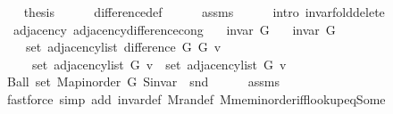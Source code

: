 \begin{isabellebody}
\ \ \isamarkupfalse%
\ {\isacharquery}{\kern0pt}thesis\isanewline
\ \ \ \ \isamarkupfalse%
\ difference{\isacharunderscore}{\kern0pt}def\isanewline
\ \ \ \ \isamarkupfalse%
\ assms{\isacharparenleft}{\kern0pt}{}{\isacharparenright}{\kern0pt}\isanewline
\ \ \ \ \isamarkupfalse%
\ {\isacharparenleft}{\kern0pt}intro\ invar{\isacharunderscore}{\kern0pt}fold{\isacharunderscore}{\kern0pt}delete{\isacharunderscore}{\kern0pt}{}{\isacharparenright}{\kern0pt}\isanewline
{}\isamarkupfalse%
%
\endisatagproof
{\isafoldproof}%
%
\isadelimproof
\isanewline
%
\endisadelimproof
\isanewline
{}\isamarkupfalse%
\ {\isacharparenleft}{\kern0pt}\ adjacency{\isacharparenright}{\kern0pt}\ adjacency{\isacharunderscore}{\kern0pt}difference{\isacharunderscore}{\kern0pt}cong{\isacharcolon}{\kern0pt}\isanewline
\ \ \ {\isachardoublequoteopen}invar\ G{}{\isachardoublequoteclose}\isanewline
\ \ \ {\isachardoublequoteopen}invar\ G{}{\isachardoublequoteclose}\isanewline
\ \ \isanewline
\ \ \ \ {\isachardoublequoteopen}set\ {\isacharparenleft}{\kern0pt}adjacency{\isacharunderscore}{\kern0pt}list\ {\isacharparenleft}{\kern0pt}difference\ G{}\ G{}{\isacharparenright}{\kern0pt}\ v{\isacharparenright}{\kern0pt}\ {\isacharequal}{\kern0pt}\isanewline
\ \ \ \ \ set\ {\isacharparenleft}{\kern0pt}adjacency{\isacharunderscore}{\kern0pt}list\ G{}\ v{\isacharparenright}{\kern0pt}\ {\isacharminus}{\kern0pt}\ set\ {\isacharparenleft}{\kern0pt}adjacency{\isacharunderscore}{\kern0pt}list\ G{}\ v{\isacharparenright}{\kern0pt}{\isachardoublequoteclose}\isanewline
%
\isadelimproof
%
\endisadelimproof
%
\isatagproof
{}\isamarkupfalse%
\ {\isacharminus}{\kern0pt}\isanewline
\ \ \isamarkupfalse%
\ {\isachardoublequoteopen}Ball\ {\isacharparenleft}{\kern0pt}set\ {\isacharparenleft}{\kern0pt}Map{\isacharunderscore}{\kern0pt}inorder\ G{}{\isacharparenright}{\kern0pt}{\isacharparenright}{\kern0pt}\ {\isacharparenleft}{\kern0pt}S{\isachardot}{\kern0pt}invar\ {\isasymcirc}\ snd{\isacharparenright}{\kern0pt}{\isachardoublequoteclose}\isanewline
\ \ \ \ \isamarkupfalse%
\ assms{\isacharparenleft}{\kern0pt}{}{\isacharparenright}{\kern0pt}\isanewline
\ \ \ \ \isamarkupfalse%
\ {\isacharparenleft}{\kern0pt}fastforce\ simp\ add{\isacharcolon}{\kern0pt}\ invar{\isacharunderscore}{\kern0pt}def\ M{\isachardot}{\kern0pt}ran{\isacharunderscore}{\kern0pt}def\ M{\isachardot}{\kern0pt}mem{\isacharunderscore}{\kern0pt}inorder{\isacharunderscore}{\kern0pt}iff{\isacharunderscore}{\kern0pt}lookup{\isacharunderscore}{\kern0pt}eq{\isacharunderscore}{\kern0pt}Some{\isacharparenright}{\kern0pt}\isanewline

\end{isabellebody}
